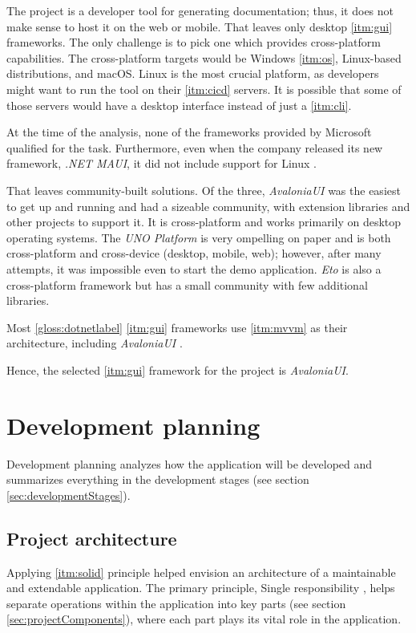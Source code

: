 The project is a developer tool for generating documentation; thus, it does not make sense to host it on the web or mobile. That leaves only desktop \ref{itm:gui} frameworks. The only challenge is to pick one which provides cross-platform capabilities. The cross-platform targets would be Windows \ref{itm:os}, Linux-based distributions, and macOS.
Linux is the most crucial platform, as developers might want to run the tool on their \ref{itm:cicd} servers. It is possible that some of those servers would have a desktop interface instead of just a \ref{itm:cli}.

At the time of the analysis, none of the frameworks provided by Microsoft qualified for the task. Furthermore, even when the company released its new framework, \textit{.NET MAUI}, it did not include support for Linux \cite{anderson_net_2022}.

That leaves community-built solutions.
Of the three, \textit{AvaloniaUI} was the easiest to get up and running and had a sizeable community, with extension libraries and other projects to support it. It is cross-platform and works primarily on desktop operating systems. The \textit{UNO Platform} is very ompelling on paper and is both cross-platform and cross-device (desktop, mobile, web); however, after many attempts, it was impossible even to start the demo application. \textit{Eto} is also a cross-platform framework but has a small community with few additional libraries.

Most \ref{gloss:dotnetlabel} \ref{itm:gui} frameworks use \ref{itm:mvvm} as their architecture, including \textit{AvaloniaUI} \cite{katz_mvvm_2022}.

Hence, the selected \ref{itm:gui} framework for the project is \textit{AvaloniaUI}.

\section{Development planning}

Development planning analyzes how the application will be developed and summarizes everything in the development stages (see section \ref{sec:developmentStages}).

\subsection{Project architecture} \label{sec:projectArchitecture}

Applying \ref{itm:solid} principle helped envision an architecture of a maintainable and extendable application.
The primary principle, Single responsibility \cite{hall_adaptive_2017}, helps separate operations within the application into key parts (see section \ref{sec:projectComponents}), where each part plays its vital role in the application.

